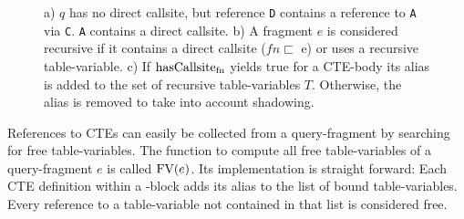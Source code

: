 \begin{figure}[h]
    \footnotesize
    \centering
    \caption{a) $q$ has no direct callsite, but reference \texttt{D} contains a reference to \texttt{A} via \texttt{C}. \texttt{A} contains a direct callsite. b) A fragment $e$ is considered recursive if it contains a direct callsite ($fn \sqsubset$ e) or uses a recursive table-variable. c) If $\operatorname{\text{hasCallsite}_{fn}}$ yields true for a CTE-body its alias is added to the set of recursive table-variables $T$. Otherwise, the alias is removed to take into account shadowing.}
    \label{fig:tracking_recursive_ctes}
\end{figure}

References to CTEs can easily be collected from a query-fragment by searching for free table-variables. The function to compute all free table-variables of a query-fragment $e$ is called $\operatorname{\text{\rm FV}}(e)$. Its implementation is straight forward: Each CTE definition within a \WITH-block adds its alias to the list of bound table-variables. Every reference to a table-variable not contained in that list is considered free.

